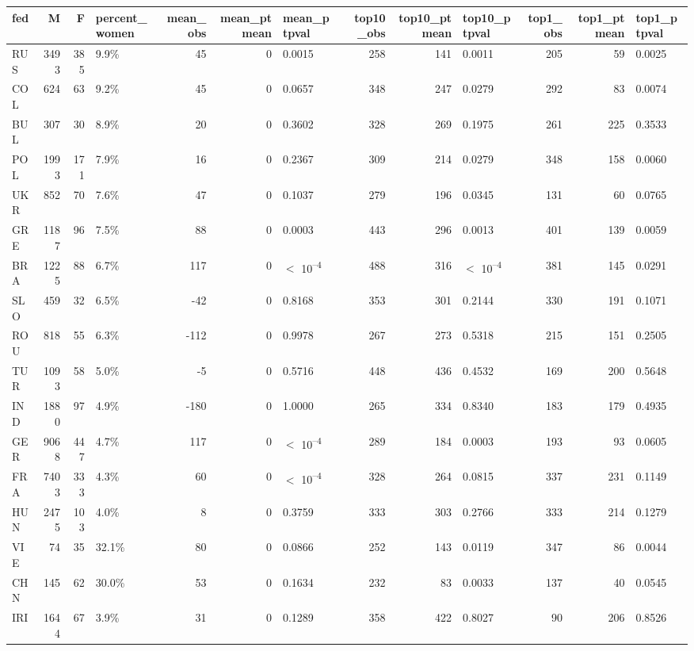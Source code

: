 
\begin{tabular}{l|r|r|l|r|r|l|r|r|l|r|r|l}
\hline
fed & M & F & percent_women & mean_obs & mean_ptmean & mean_ptpval & top10_obs & top10_ptmean & top10_ptpval & top1_obs & top1_ptmean & top1_ptpval\\
\hline
RUS & 3493 & 385 & 9.9\% & 45 & 0 & 0.0015 & 258 & 141 & 0.0011 & 205 & 59 & 0.0025\\
\hline
COL & 624 & 63 & 9.2\% & 45 & 0 & 0.0657 & 348 & 247 & 0.0279 & 292 & 83 & 0.0074\\
\hline
BUL & 307 & 30 & 8.9\% & 20 & 0 & 0.3602 & 328 & 269 & 0.1975 & 261 & 225 & 0.3533\\
\hline
POL & 1993 & 171 & 7.9\% & 16 & 0 & 0.2367 & 309 & 214 & 0.0279 & 348 & 158 & 0.0060\\
\hline
UKR & 852 & 70 & 7.6\% & 47 & 0 & 0.1037 & 279 & 196 & 0.0345 & 131 & 60 & 0.0765\\
\hline
GRE & 1187 & 96 & 7.5\% & 88 & 0 & 0.0003 & 443 & 296 & 0.0013 & 401 & 139 & 0.0059\\
\hline
BRA & 1225 & 88 & 6.7\% & 117 & 0 & $<$ 10\textsuperscript{--4} & 488 & 316 & $<$ 10\textsuperscript{--4} & 381 & 145 & 0.0291\\
\hline
SLO & 459 & 32 & 6.5\% & -42 & 0 & 0.8168 & 353 & 301 & 0.2144 & 330 & 191 & 0.1071\\
\hline
ROU & 818 & 55 & 6.3\% & -112 & 0 & 0.9978 & 267 & 273 & 0.5318 & 215 & 151 & 0.2505\\
\hline
TUR & 1093 & 58 & 5.0\% & -5 & 0 & 0.5716 & 448 & 436 & 0.4532 & 169 & 200 & 0.5648\\
\hline
IND & 1880 & 97 & 4.9\% & -180 & 0 & 1.0000 & 265 & 334 & 0.8340 & 183 & 179 & 0.4935\\
\hline
GER & 9068 & 447 & 4.7\% & 117 & 0 & $<$ 10\textsuperscript{--4} & 289 & 184 & 0.0003 & 193 & 93 & 0.0605\\
\hline
FRA & 7403 & 333 & 4.3\% & 60 & 0 & $<$ 10\textsuperscript{--4} & 328 & 264 & 0.0815 & 337 & 231 & 0.1149\\
\hline
HUN & 2475 & 103 & 4.0\% & 8 & 0 & 0.3759 & 333 & 303 & 0.2766 & 333 & 214 & 0.1279\\
\hline
VIE & 74 & 35 & 32.1\% & 80 & 0 & 0.0866 & 252 & 143 & 0.0119 & 347 & 86 & 0.0044\\
\hline
CHN & 145 & 62 & 30.0\% & 53 & 0 & 0.1634 & 232 & 83 & 0.0033 & 137 & 40 & 0.0545\\
\hline
IRI & 1644 & 67 & 3.9\% & 31 & 0 & 0.1289 & 358 & 422 & 0.8027 & 90 & 206 & 0.8526\\

\end{tabular}
